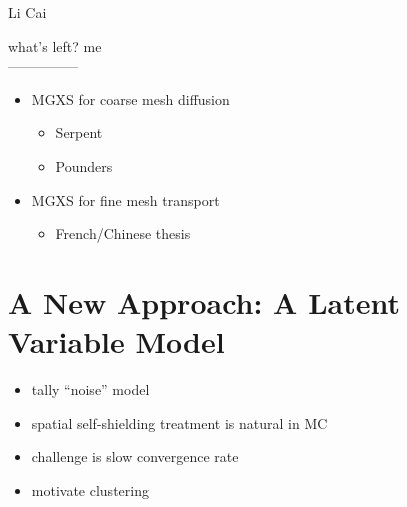 Li Cai~\cite{cai2014condensation}


what's left? me\\
---------------\\


\begin{itemize}[noitemsep]
  \item \ac{MGXS} for coarse mesh diffusion
  \begin{itemize}[noitemsep]
    \item Serpent
    \item Pounders
  \end{itemize}
  \item \ac{MGXS} for fine mesh transport
  \begin{itemize}[noitemsep]
    \item French/Chinese thesis
  \end{itemize}
\end{itemize}


\section{A New Approach: A Latent Variable Model}
\label{sec:chap3-latent-variables}

\begin{itemize}[noitemsep]
  \item tally ``noise'' model
  \item spatial self-shielding treatment is natural in \ac{MC}
  \item challenge is slow convergence rate
  \item motivate clustering
\end{itemize}